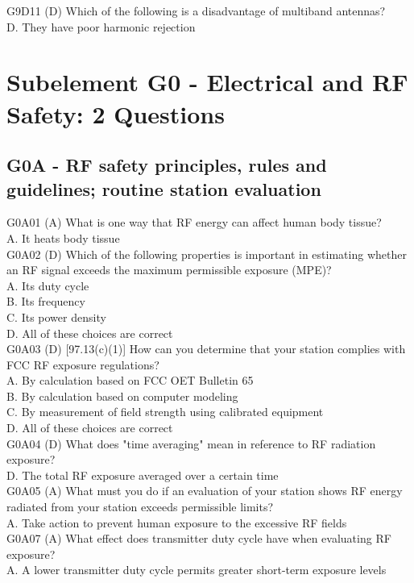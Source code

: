 \documentclass[12pt,letterpaper]{report}
\begin{document}
G9D11 (D) Which of the following is a disadvantage of multiband antennas?\\
D. They have poor harmonic rejection\\

\chapter{Subelement G0 - Electrical and RF Safety: 2 Questions}
\section{G0A - RF safety principles, rules and guidelines; routine station evaluation}

G0A01 (A) What is one way that RF energy can affect human body tissue?\\
A. It heats body tissue\\

G0A02 (D) Which of the following properties is important in estimating whether an RF signal exceeds the maximum permissible exposure (MPE)?\\
A. Its duty cycle\\
B. Its frequency\\
C. Its power density\\
D. All of these choices are correct\\

G0A03 (D) [97.13(c)(1)] How can you determine that your station complies with FCC RF exposure regulations?\\
A. By calculation based on FCC OET Bulletin 65\\
B. By calculation based on computer modeling\\
C. By measurement of field strength using calibrated equipment\\
D. All of these choices are correct\\

G0A04 (D) What does "time averaging" mean in reference to RF radiation exposure?\\
D. The total RF exposure averaged over a certain time\\

G0A05 (A) What must you do if an evaluation of your station shows RF energy radiated from your station exceeds permissible limits?\\
A. Take action to prevent human exposure to the excessive RF fields\\

G0A07 (A) What effect does transmitter duty cycle have when evaluating RF exposure? \\
A. A lower transmitter duty cycle permits greater short-term exposure levels\\
\end{document}
